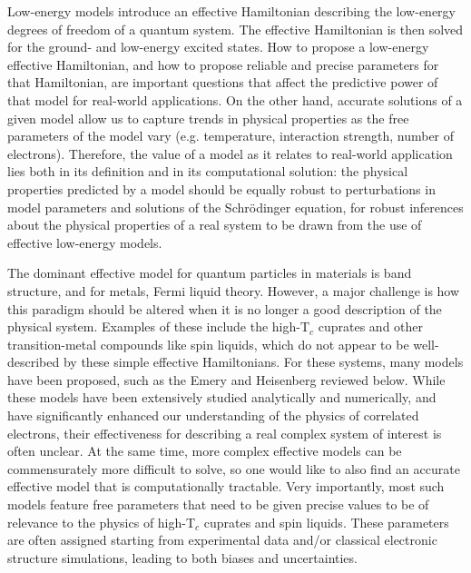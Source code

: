 Low-energy models introduce an effective Hamiltonian describing the low-energy degrees of freedom of a quantum system. The effective Hamiltonian is then solved for the ground- and low-energy excited states.
How to propose a low-energy effective Hamiltonian, and how to propose reliable and precise parameters for that Hamiltonian, are important questions that affect the predictive power of that model for real-world applications.
On the other hand, accurate solutions of a given model allow us to capture trends in physical properties as the free parameters of the model vary (e.g. temperature, interaction strength, number of electrons).
Therefore, the value of a model as it relates to real-world application lies both in its definition and in its computational solution: the physical properties predicted by a model should be equally robust to perturbations in model parameters and solutions of the Schrödinger equation, for robust inferences about the physical properties of a real system to be drawn from the use of effective low-energy models.

The dominant effective model for quantum particles in materials is band structure, and for metals, Fermi liquid theory. However, a major challenge is how this paradigm should be altered when it is no longer a good description of the physical system. Examples of these include the high-T$_c$ cuprates and other transition-metal compounds like spin liquids, which do not appear to be well-described by these simple effective Hamiltonians. For these systems, many models have been proposed, such as the Emery and Heisenberg reviewed below. While these models have been extensively studied analytically and numerically, and have significantly enhanced our understanding of the physics of correlated electrons, their effectiveness for describing a real complex system of interest is often unclear. At the same time, more complex effective models can be commensurately more difficult to solve, so one would like to also find an accurate effective model that is computationally tractable.
Very importantly, most such models feature free parameters that need to be given precise values to be of relevance to the physics of high-T$_c$ cuprates and spin liquids. These parameters are often assigned starting from experimental data and/or classical electronic structure simulations, leading to both biases and uncertainties.


